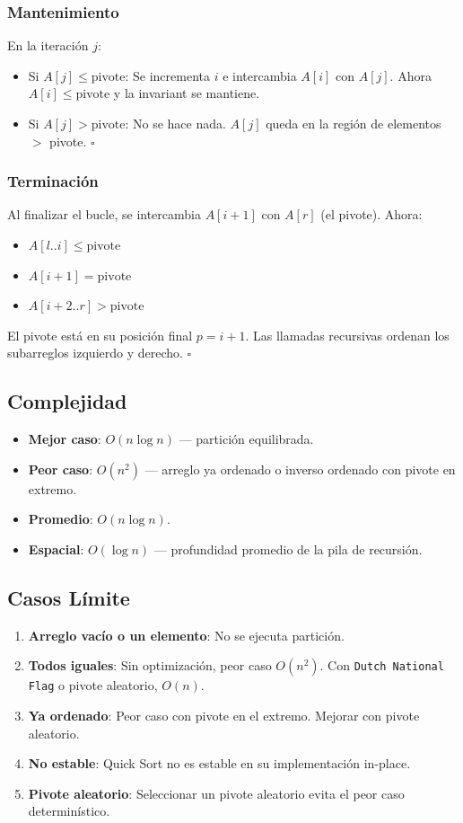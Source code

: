 \documentclass[11pt,a4paper]{article}
\begin{document}
\subsubsection{Mantenimiento}
En la iteración $j$:
\begin{itemize}
    \item Si $A[j] \leq \text{pivote}$: Se incrementa $i$ e intercambia $A[i]$ con $A[j]$. Ahora $A[i] \leq \text{pivote}$ y la invariant se mantiene.
    \item Si $A[j] > \text{pivote}$: No se hace nada. $A[j]$ queda en la región de elementos $>$ pivote. $\square$
\end{itemize}

\subsubsection{Terminación}
Al finalizar el bucle, se intercambia $A[i+1]$ con $A[r]$ (el pivote). Ahora:
\begin{itemize}
    \item $A[l..i] \leq \text{pivote}$
    \item $A[i+1] = \text{pivote}$
    \item $A[i+2..r] > \text{pivote}$
\end{itemize}
El pivote está en su posición final $p = i+1$. Las llamadas recursivas ordenan los subarreglos izquierdo y derecho. $\square$

\subsection{Complejidad}
\begin{itemize}
    \item \textbf{Mejor caso}: $O(n \log n)$ --- partición equilibrada.
    \item \textbf{Peor caso}: $O(n^2)$ --- arreglo ya ordenado o inverso ordenado con pivote en extremo.
    \item \textbf{Promedio}: $O(n \log n)$.
    \item \textbf{Espacial}: $O(\log n)$ --- profundidad promedio de la pila de recursión.
\end{itemize}

\subsection{Casos Límite}
\begin{enumerate}
    \item \textbf{Arreglo vacío o un elemento}: No se ejecuta partición.
    \item \textbf{Todos iguales}: Sin optimización, peor caso $O(n^2)$. Con \texttt{Dutch National Flag} o pivote aleatorio, $O(n)$.
    \item \textbf{Ya ordenado}: Peor caso con pivote en el extremo. Mejorar con pivote aleatorio.
    \item \textbf{No estable}: Quick Sort no es estable en su implementación in-place.
    \item \textbf{Pivote aleatorio}: Seleccionar un pivote aleatorio evita el peor caso determinístico.
\end{enumerate}
\end{document}
